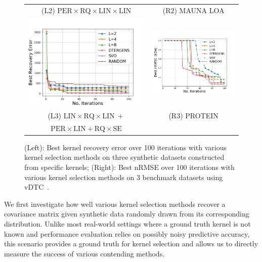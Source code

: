 \begin{figure}
\begin{tabular}{cc}
\vspace{-2mm}
(L2) $\mathrm{PER} \times \mathrm{RQ} \times \mathrm{LIN} \times \mathrm{LIN}$ & (R2) MAUNA LOA \\
\vspace{-3mm}
\includegraphics[width=0.45\linewidth]{./kernel_plots/synthetic_exp2.png} &
\includegraphics[width=0.45\linewidth]{./kernel_plots/protein.png} \\
\vspace{-3mm}
(L3) $\mathrm{LIN} \times \mathrm{RQ} \times \mathrm{LIN} \ + $ & (R3) PROTEIN \\
$\mathrm{PER} \times \mathrm{LIN} + \mathrm{RQ} \times \mathrm{SE}$ & \\
\end{tabular}
\caption{
(Left): Best kernel recovery error over 100 iterations with various kernel selection methods on three synthetic datasets constructed from specific kernels; (Right):
Best nRMSE over 100 iterations with various kernel selection methods on 3 benchmark datasets using vDTC~\cite{Hensman13}.}
\label{app-ks-fig:recovery}
\end{figure}
We first investigate how well various kernel selection methods recover a covariance matrix given synthetic data randomly drawn from its corresponding distribution. Unlike most real-world settings where a ground truth kernel is not known and performance evaluation relies on possibly noisy predictive accuracy, this scenario provides a ground truth for kernel selection and allows us to directly measure the success of various contending methods.

